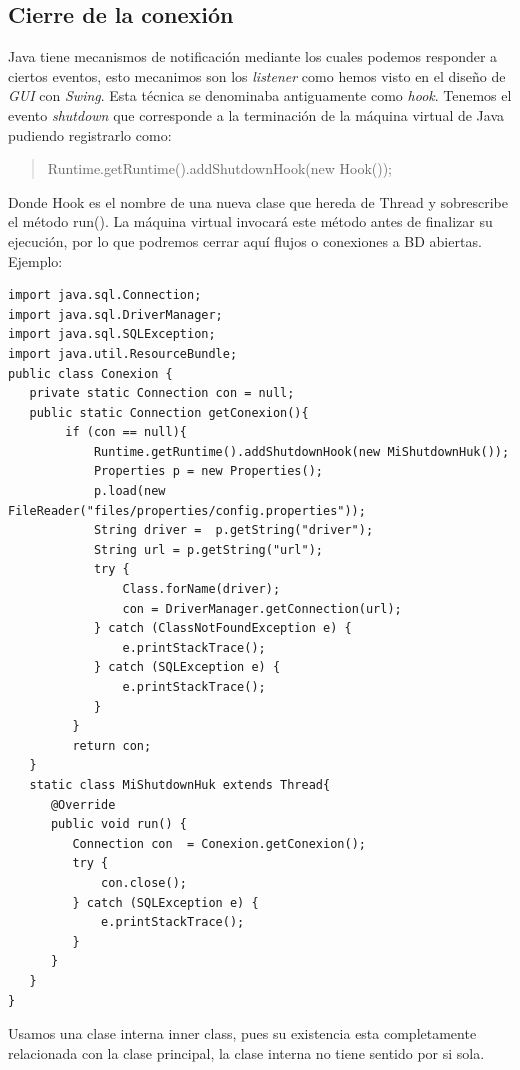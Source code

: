 \documentclass[4paper]{article}
\begin{document}
\subsection{Cierre de la conexión}
Java tiene mecanismos de notificación mediante los cuales podemos responder a ciertos eventos, esto mecanimos son los \emph{listener} como hemos visto en el diseño de \emph{GUI} con \emph{Swing}. Esta técnica se denominaba antiguamente como \emph{hook}.
Tenemos el evento \emph{shutdown} que corresponde a la terminación de la máquina virtual de Java pudiendo registrarlo como:
\begin{quote}
			Runtime.getRuntime().addShutdownHook(new Hook());
\end{quote}
Donde Hook es el nombre de una nueva clase que hereda de Thread y sobrescribe el método run(). La máquina virtual invocará este método antes de finalizar su ejecución, por lo que podremos cerrar aquí flujos o conexiones a BD abiertas. Ejemplo:
\begin{lstlisting}
import java.sql.Connection;
import java.sql.DriverManager;
import java.sql.SQLException;
import java.util.ResourceBundle;
public class Conexion {
   private static Connection con = null;
   public static Connection getConexion(){
        if (con == null){
            Runtime.getRuntime().addShutdownHook(new MiShutdownHuk());
            Properties p = new Properties();
            p.load(new FileReader("files/properties/config.properties"));
            String driver =  p.getString("driver");
            String url = p.getString("url");
            try {
                Class.forName(driver);
                con = DriverManager.getConnection(url);
            } catch (ClassNotFoundException e) {
                e.printStackTrace();
            } catch (SQLException e) {
                e.printStackTrace();
            }
         }
         return con;
   }
   static class MiShutdownHuk extends Thread{
      @Override
      public void run() {
         Connection con  = Conexion.getConexion();
         try {
             con.close();
         } catch (SQLException e) {
             e.printStackTrace();
         }
      }
   }
}
\end{lstlisting}
Usamos una clase interna inner class, pues su existencia esta completamente relacionada con la clase principal, la clase interna no tiene sentido por si sola.
\end{document}
